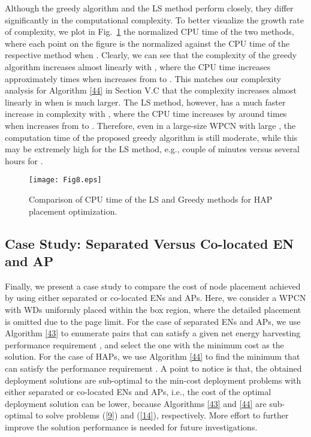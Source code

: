 \documentclass[journal, draftcls, one column, 12pt]{IEEEtran}
\begin{document}
Although the greedy algorithm and the LS method perform closely, they differ significantly in the computational complexity. To better visualize the growth rate of complexity, we plot in Fig.~\ref{70} the normalized CPU time of the two methods, where each point on the figure is the normalized against the CPU time of the respective method when . Clearly, we can see that the complexity of the greedy algorithm increases almost linearly with , where the CPU time increases approximately  times when  increases from  to . This matches our complexity analysis for Algorithm \ref{44} in Section V.C that the complexity increases almost linearly in  when  is much larger. The LS method, however, has a much faster increase in complexity with , where the CPU time increases by around  times when  increases from  to . Therefore, even in a large-size WPCN with large , the computation time of the proposed greedy algorithm is still moderate, while this may be extremely high for the LS method, e.g., couple of minutes versus several hours for .

\begin{figure}
\centering
  \begin{center}
    \texttt{[image: Fig8.eps]}
  \end{center}
  \caption{Comparison of CPU time of the LS and Greedy methods for HAP placement optimization.}
  \label{70}
\end{figure}

\subsection{Case Study: Separated Versus Co-located EN and AP}
Finally, we present a case study to compare the cost of node placement achieved by using either separated or co-located ENs and APs. Here, we consider a WPCN with  WDs uniformly placed within the  box region, where the detailed placement is omitted due to the page limit. For the case of separated ENs and APs, we use Algorithm \ref{43} to enumerate  pairs that can satisfy a given net energy harvesting performance requirement , and select the one with the minimum cost as the solution. For the case of HAPs, we use Algorithm \ref{44} to find the minimum  that can satisfy the performance requirement . A point to notice is that, the obtained deployment solutions are sub-optimal to the min-cost deployment problems with either separated or co-located ENs and APs, i.e., the cost of the optimal deployment solution can be lower, because Algorithms \ref{43} and \ref{44} are sub-optimal to solve problems (\ref{9}) and (\ref{14}), respectively. More effort to further improve the solution performance is needed for future investigations.
\end{document}

